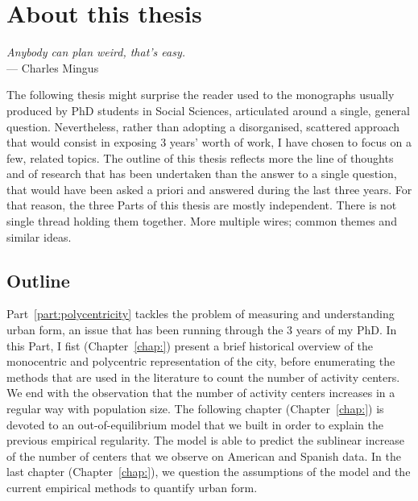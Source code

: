 

\chapter{About this thesis}
\label{chap:methodology}


\begin{flushright}{\slshape    
Anybody can plan weird, that's easy.} \\ \medskip
--- Charles Mingus
\end{flushright}


\bigskip 


The following thesis might surprise the reader used to the monographs usually
produced by PhD students in Social Sciences, articulated around a single,
general question. Nevertheless, rather than adopting a disorganised, scattered
approach that would consist in exposing $3$ years' worth of work, I have chosen
to focus on a few, related topics. The outline of this thesis reflects more the
line of thoughts and of research that has been undertaken than the answer to a
single question, that would have been asked a priori and answered during the
last three years. For that reason, the three Parts of this thesis are mostly
independent. There is not single thread holding them together. More multiple
wires; common themes and similar ideas. 

\section{Outline}

Part~\ref{part:polycentricity} tackles the problem of measuring and
understanding urban form, an issue that has been running through the $3$
years of my PhD. In this Part, I fist (Chapter~\ref{chap:}) present a brief historical overview of the monocentric
and polycentric representation of the city, before enumerating the methods that
are used in the literature to count the number of activity centers. We end with
the observation that the number of activity centers increases in a regular way
with population size. The following chapter (Chapter~\ref{chap:}) is devoted to an out-of-equilibrium
model that we built in order to explain the previous empirical regularity. The
model is able to predict the sublinear increase of the number of centers that we
observe on American and Spanish data. In the last chapter (Chapter~\ref{chap:}), we question the
assumptions of the model and the current empirical methods to quantify urban
form.\\

